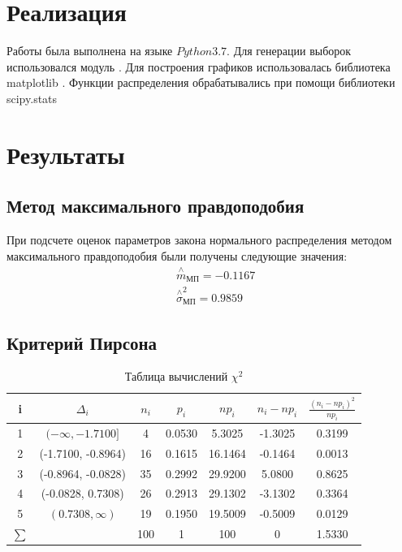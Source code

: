 \documentclass[12pt]{report}
\begin{document}
\section{Реализация}
Работы была выполнена на языке $Python 3.7.$
Для генерации выборок использовался модуль \cite{numpy}.
Для построения графиков использовалась библиотека matplotlib \cite{plotlib}.
Функции распределения обрабатывались при помощи библиотеки scipy.stats \cite{skp}


\section{Результаты}
\subsection{Метод максимального правдоподобия}

При подсчете оценок параметров закона нормального распределения методом максимального правдоподобия были получены следующие значения:
\begin{equation}
\begin{split}
    &\overset{\wedge}{m}_{\text{МП}} = -0.1167\\
   &  \overset{\wedge}{\sigma}^2_{\text{МП}} = 0.9859
\end{split}
\end{equation}
\subsection{Критерий Пирсона}
\begin{table}[H]
\caption{Таблица вычислений $\chi^2$}
\label{tab:my_label1}
\begin{center}
\vspace{5mm}
\begin{tabular}{|c|c|c|c|c|c|c|}
\hline
 i & $\Delta_i$ & $n_i$ & $p_i$ & $np_i$ & $n_i-np_i$ & $\frac{(n_i-np_i)^2}{np_i}$\\
\hline
1&	 $(-\infty, -1.7100]$ &	4  &0.0530& 5.3025& -1.3025& 0.3199\\
\hline
2& (-1.7100, -0.8964)& 16& 0.1615& 16.1464& -0.1464& 0.0013\\
\hline
3& (-0.8964, -0.0828)& 35& 0.2992& 29.9200& 5.0800& 0.8625\\
\hline
4& (-0.0828, 0.7308)& 26& 0.2913& 29.1302& -3.1302& 0.3364\\
\hline
5& $(0.7308, \infty)$& 19& 0.1950& 19.5009& -0.5009& 0.0129\\
\hline
$\sum$&&		100&	1&	100&0&1.5330	\\

\hline
\end{tabular}
\end{center}
\end{table}
\end{document}
